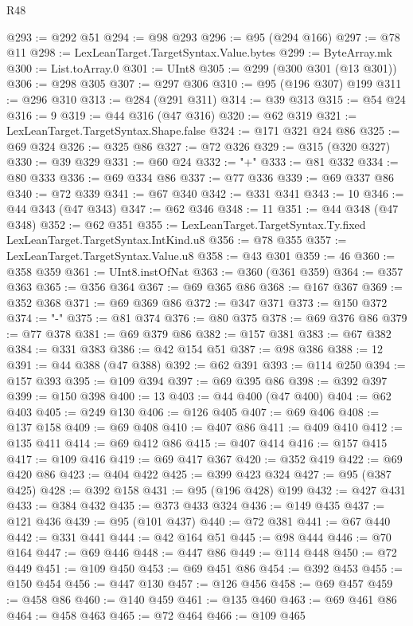 \begin{lexlean}{R48}
\begin{coremodule}
@293 := @292 @51
@294 := @98 @293
@296 := @95 (@294 @166)
@297 := @78 @11
@298 := LexLeanTarget.TargetSyntax.Value.bytes
@299 := ByteArray.mk
@300 := List.toArray.{0}
@301 := UInt8
@305 := @299 (@300 @301 (@13 @301))
@306 := @298 @305
@307 := @297 @306
@310 := @95 (@196 @307) @199
@311 := @296 @310
@313 := @284 (@291 @311)
@314 := @39 @313
@315 := @54 @24
@316 := 9
@319 := @44 @316 (@47 @316)
@320 := @62 @319
@321 := LexLeanTarget.TargetSyntax.Shape.false
@324 := @171 @321 @24 @86
@325 := @69 @324
@326 := @325 @86
@327 := @72 @326
@329 := @315 (@320 @327)
@330 := @39 @329
@331 := @60 @24
@332 := "+"
@333 := @81 @332
@334 := @80 @333
@336 := @69 @334 @86
@337 := @77 @336
@339 := @69 @337 @86
@340 := @72 @339
@341 := @67 @340
@342 := @331 @341
@343 := 10
@346 := @44 @343 (@47 @343)
@347 := @62 @346
@348 := 11
@351 := @44 @348 (@47 @348)
@352 := @62 @351
@355 := LexLeanTarget.TargetSyntax.Ty.fixed LexLeanTarget.TargetSyntax.IntKind.u8
@356 := @78 @355
@357 := LexLeanTarget.TargetSyntax.Value.u8
@358 := @43 @301
@359 := 46
@360 := @358 @359
@361 := UInt8.instOfNat
@363 := @360 (@361 @359)
@364 := @357 @363
@365 := @356 @364
@367 := @69 @365 @86
@368 := @167 @367
@369 := @352 @368
@371 := @69 @369 @86
@372 := @347 @371
@373 := @150 @372
@374 := "-"
@375 := @81 @374
@376 := @80 @375
@378 := @69 @376 @86
@379 := @77 @378
@381 := @69 @379 @86
@382 := @157 @381
@383 := @67 @382
@384 := @331 @383
@386 := @42 @154 @51
@387 := @98 @386
@388 := 12
@391 := @44 @388 (@47 @388)
@392 := @62 @391
@393 := @114 @250
@394 := @157 @393
@395 := @109 @394
@397 := @69 @395 @86
@398 := @392 @397
@399 := @150 @398
@400 := 13
@403 := @44 @400 (@47 @400)
@404 := @62 @403
@405 := @249 @130
@406 := @126 @405
@407 := @69 @406
@408 := @137 @158
@409 := @69 @408
@410 := @407 @86
@411 := @409 @410
@412 := @135 @411
@414 := @69 @412 @86
@415 := @407 @414
@416 := @157 @415
@417 := @109 @416
@419 := @69 @417 @367
@420 := @352 @419
@422 := @69 @420 @86
@423 := @404 @422
@425 := @399 @423 @324
@427 := @95 (@387 @425)
@428 := @392 @158
@431 := @95 (@196 @428) @199
@432 := @427 @431
@433 := @384 @432
@435 := @373 @433 @324
@436 := @149 @435
@437 := @121 @436
@439 := @95 (@101 @437)
@440 := @72 @381
@441 := @67 @440
@442 := @331 @441
@444 := @42 @164 @51
@445 := @98 @444
@446 := @70 @164
@447 := @69 @446
@448 := @447 @86
@449 := @114 @448
@450 := @72 @449
@451 := @109 @450
@453 := @69 @451 @86
@454 := @392 @453
@455 := @150 @454
@456 := @447 @130
@457 := @126 @456
@458 := @69 @457
@459 := @458 @86
@460 := @140 @459
@461 := @135 @460
@463 := @69 @461 @86
@464 := @458 @463
@465 := @72 @464
@466 := @109 @465

\end{coremodule}
\end{lexlean}
